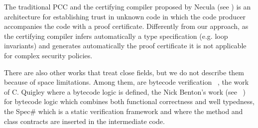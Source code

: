 
 The traditional PCC and the certifying compiler proposed by Necula (see \cite{ComNec,DesNecLee98}) is an architecture for 
 establishing trust in unknown code in which the code producer accompanies the code with a proof certificate. Differently from our approach,
  as the certifying compiler infers automatically a type specification (e.g. loop invariants) and generates automatically the proof certificate
  it is not applicable for complex security policies.

There are also other works that treat close fields, but we do not describe them because of space limitations.
Among them, are bytecode verification ~\cite{Ljbc}, the work of C. Quigley \cite{Quigley} where a bytecode logic is defined, 
the Nick Benton's work (see ~\cite{B04tlsj}) for bytecode logic which combines both functional correctness and well typedness,  
the Spec\# \cite{BLS04sp} which is a static verification framework and where the method and class contracts are inserted in the intermediate code. 



 
